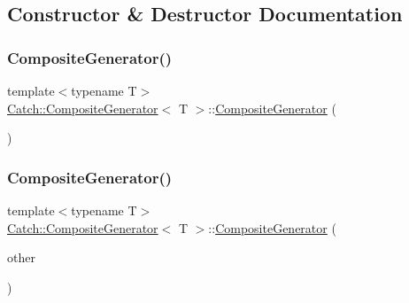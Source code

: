 \subsection{Constructor \& Destructor Documentation}
\mbox{\label{class_catch_1_1_composite_generator_a923398b140371d1783858766864a1af5}} 
\subsubsection{\texorpdfstring{Composite\+Generator()}{CompositeGenerator()}\hspace{0.1cm}{\footnotesize\ttfamily [1/2]}}
{\footnotesize\ttfamily template$<$typename T$>$ \\
\mbox{\hyperlink{class_catch_1_1_composite_generator}{Catch\+::\+Composite\+Generator}}$<$ T $>$\+::\mbox{\hyperlink{class_catch_1_1_composite_generator}{Composite\+Generator}} (\begin{DoxyParamCaption}{ }\end{DoxyParamCaption})\hspace{0.3cm}{\ttfamily [inline]}}

\mbox{\label{class_catch_1_1_composite_generator_a21a7070a00e4a6fe021294c356692692}} 
\subsubsection{\texorpdfstring{Composite\+Generator()}{CompositeGenerator()}\hspace{0.1cm}{\footnotesize\ttfamily [2/2]}}
{\footnotesize\ttfamily template$<$typename T$>$ \\
\mbox{\hyperlink{class_catch_1_1_composite_generator}{Catch\+::\+Composite\+Generator}}$<$ T $>$\+::\mbox{\hyperlink{class_catch_1_1_composite_generator}{Composite\+Generator}} (\begin{DoxyParamCaption}\item[{\mbox{\hyperlink{class_catch_1_1_composite_generator}{Composite\+Generator}}$<$ T $>$ \&}]{other }\end{DoxyParamCaption})\hspace{0.3cm}{\ttfamily [inline]}}

